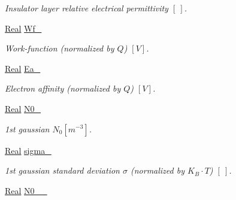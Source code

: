 \begin{DoxyCompactItemize}
\begin{DoxyCompactList}\small\item\em Insulator layer relative electrical permittivity $ \left[ ~ \right] $. \end{DoxyCompactList}\item 
\hypertarget{classParamList_a9121165703c9ef6b60fe469701a48fad}{\hyperlink{typedefs_8h_a060b837c3b4486ee35317744156f3da2}{Real} \hyperlink{classParamList_a9121165703c9ef6b60fe469701a48fad}{Wf\-\_\-}}\label{classParamList_a9121165703c9ef6b60fe469701a48fad}

\begin{DoxyCompactList}\small\item\em Work-\/function (normalized by $ Q $) $ \left[ V \right] $. \end{DoxyCompactList}\item 
\hypertarget{classParamList_aed555e87b2a431b6ecabaf17813ed289}{\hyperlink{typedefs_8h_a060b837c3b4486ee35317744156f3da2}{Real} \hyperlink{classParamList_aed555e87b2a431b6ecabaf17813ed289}{Ea\-\_\-}}\label{classParamList_aed555e87b2a431b6ecabaf17813ed289}

\begin{DoxyCompactList}\small\item\em Electron affinity (normalized by $ Q $) $ \left[ V \right] $. \end{DoxyCompactList}\item 
\hypertarget{classParamList_aa51672586248c54289ad6ac1a5d3c274}{\hyperlink{typedefs_8h_a060b837c3b4486ee35317744156f3da2}{Real} \hyperlink{classParamList_aa51672586248c54289ad6ac1a5d3c274}{N0\-\_\-}}\label{classParamList_aa51672586248c54289ad6ac1a5d3c274}

\begin{DoxyCompactList}\small\item\em 1st gaussian $ N_0 \left[ m^{-3} \right] $. \end{DoxyCompactList}\item 
\hypertarget{classParamList_a37293181f9beea97f75b133deb9d9119}{\hyperlink{typedefs_8h_a060b837c3b4486ee35317744156f3da2}{Real} \hyperlink{classParamList_a37293181f9beea97f75b133deb9d9119}{sigma\-\_\-}}\label{classParamList_a37293181f9beea97f75b133deb9d9119}

\begin{DoxyCompactList}\small\item\em 1st gaussian standard deviation $ \sigma $ (normalized by $ K_B \cdot T $) $ \left[ ~ \right] $. \end{DoxyCompactList}\item 
\hypertarget{classParamList_a5cd86383f9ae39d6a8851c5b470051eb}{\hyperlink{typedefs_8h_a060b837c3b4486ee35317744156f3da2}{Real} \hyperlink{classParamList_a5cd86383f9ae39d6a8851c5b470051eb}{N0\-\_\-\_\-}}\label{classParamList_a5cd86383f9ae39d6a8851c5b470051eb}


\end{DoxyCompactItemize}

